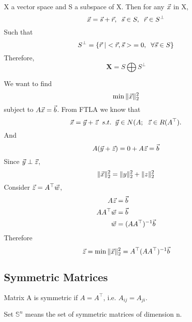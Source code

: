 \begin{theorem}
X a vector space and S a subspace of X. Then for any $\vec{x}$ in X,
\[
\vec{x} = \vec{s} + \vec{r}, \;\; \vec{s} \in S,\;\; \vec{r} \in S^\perp
\]
Such that
\[
S^\perp = \{\vec{r}\;|<\vec{r}, \vec{s}>\;=0,\;\; \forall \vec{s}\in S\}
\]
Therefore, 
\[
\mathbf{X} = S\bigoplus S^\perp
\]
\end{theorem}

\begin{example}
	We want to find
	\[
\min \|\vec{x}\|_2^2
	\]
	subject to $A\vec{x}=\vec{b}$.
	From FTLA we know that
	\[
\vec{x} = \vec{y}+\vec{z}\;\;s.t.\;\;\vec{y}\in N(A;\;\;\vec{z}\in R(A^\top).
	\]
	And
	\[
A(\vec{y}+\vec{z}) = 0 + A\vec{z} = \vec{b}
	\]
	Since $\vec{y} \perp \vec{z}$,
	\[
\|\vec{x}\|_2^2 = \|y\|_2^2+\|z\|_2^2
	\]
	Consider $\vec{z} = A^\top\vec{w}$, 
	\begin{align*}
		A\vec{z} &= \vec{b}\\
		AA^\top\vec{w} &= \vec{b}\\
		\vec{w} &= (AA^\top)^{-1}\vec{b}
	\end{align*}
	Therefore
	\[
\vec{z} = \min{\|\vec{x}\|_2^2} =  A^\top(AA^\top)^{-1}\vec{b}
	\]
\end{example}


\subsection{Symmetric Matrices} %
\label{sub:symmetric_matrices}

\begin{definition}
	Matrix A is symmetric if $A=A^\top$, i.e. $A_{ij} = A_{ji}$. 

	Set $\mathbb{S}^n$ means the set of symmetric matrices of dimension n.
\end{definition}





